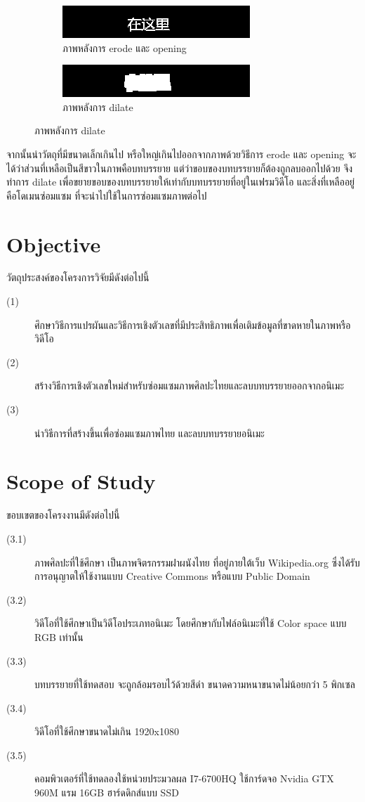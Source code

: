 \documentclass[hidelinks,a4paper,14pt]{article}
\numberwithin{equation}{section}							%
\begin{document}
{		\begin{figure}[H]
			\begin{subfigure}{0.4\linewidth}
				\centering
				\includegraphics[width=0.4\linewidth]{images/detection-erode-opening.png}
				\caption{ภาพหลังการ erode และ opening}
			\end{subfigure}
			\begin{subfigure}{0.4\linewidth}
				\centering
				\includegraphics[width=0.4\linewidth]{images/detection-stoke.png}
				\caption{ภาพหลังการ dilate}
			\end{subfigure}
		\end{figure}
		
		จากนั้นนำวัตถุที่มีขนาดเล็กเกินไป หรือใหญ่เกินไปออกจากภาพด้วยวิธีการ erode และ opening
		จะได้ว่าส่วนที่เหลือเป็นสีขาวในภาพคือบทบรรยาย แต่ว่าขอบของบทบรรยายก็ต้องถูกลบออกไปด้วย จึงทำการ dilate เพื่อขยายขอบของบทบรรยายให้เท่ากับบทบรรยายที่อยู่ในเฟรมวิดีโอ และสิ่งที่เหลืออยู่คือโดเมนซ่อมแซม ที่จะนำไปใช้ในการซ่อมแซมภาพต่อไป
		
\section{Objective}
วัตถุประสงค์ของโครงการวิจัยมีดังต่อไปนี้
\begin{description}
	\item[(1)]	 ศึกษาวิธีการแปรผันและวิธีการเชิงตัวเลขที่มีประสิทธิภาพเพื่อเติมข้อมูลที่ขาดหายในภาพหรือวิดีโอ
	\item[(2)] สร้างวิธีการเชิงตัวเลขใหม่สำหรับซ่อมแซมภาพศิลปะไทยและลบบทบรรยายออกจากอนิเมะ
	\item[(3)] นำวิธีการที่สร้างขึ้นเพื่อซ่อมแซมภาพไทย และลบบทบรรยายอนิเมะ	 
\end{description}

\section{Scope of Study}
ขอบเขตของโครงงานมีดังต่อไปนี้
\begin{description}
\item[(3.1)] ภาพศิลปะที่ใช้ศึกษา เป็นภาพจิตรกรรมฝาผนังไทย ที่อยู่ภายใต้เว็บ Wikipedia.org ซึ่งได้รับการอนุญาตให้ใช้งานแบบ Creative Commons หรือแบบ Public Domain
\item[(3.2)] วิดีโอที่ใช้ศึกษาเป็นวิดีโอประเภทอนิเมะ โดยศึกษากับไฟล์อนิเมะที่ใช้ Color space แบบ RGB เท่านั้น
\item[(3.3)] บทบรรยายที่ใช้ทดสอบ จะถูกล้อมรอบไว้ด้วยสีดำ ขนาดความหนาขนาดไม่น้อยกว่า 5 พิกเซล
\item[(3.4)] วิดีโอที่ใช้ศึกษาขนาดไม่เกิน 1920x1080
\item[(3.5)] คอมพิวเตอร์ที่ใช้ทดลองใช้หน่วยประมวลผล I7-6700HQ ใช้การ์ดจอ Nvidia GTX 960M แรม 16GB ฮาร์ดดิกส์แบบ SSD
\end{description}

}
\end{document}

